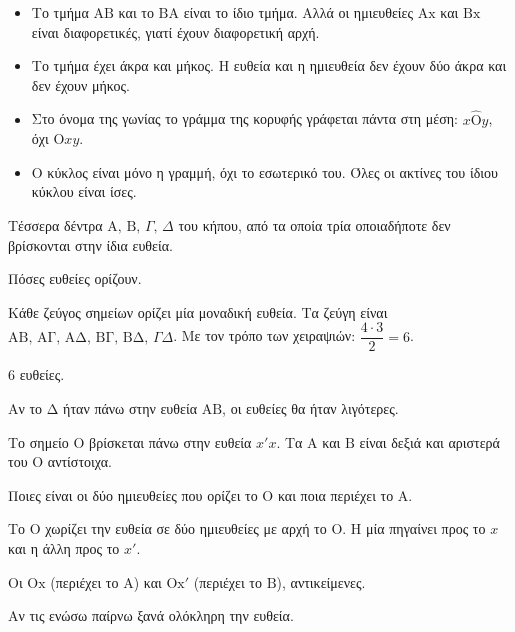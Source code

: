 \begin{center}
\end{center}

\begin{prosoxi}
\begin{itemize}[leftmargin=1.2em,itemsep=0.3ex,topsep=2pt]
\item Το τμήμα $\mathrm{ΑΒ}$ και το $\mathrm{ΒΑ}$ είναι το ίδιο τμήμα. Αλλά οι ημιευθείες $\mathrm{Αx}$ και $\mathrm{Βx}$ είναι διαφορετικές, γιατί έχουν διαφορετική αρχή.
\item Το τμήμα έχει άκρα και μήκος. Η ευθεία και η ημιευθεία δεν έχουν δύο άκρα και δεν έχουν μήκος.
\item Στο όνομα της γωνίας το γράμμα της κορυφής γράφεται πάντα στη μέση: $x\hat{\mathrm{Ο}}y$, όχι $\mathrm{Ο}xy$.
\item Ο κύκλος είναι μόνο η γραμμή, όχι το εσωτερικό του. Όλες οι ακτίνες του ίδιου κύκλου είναι ίσες.
\end{itemize}
\end{prosoxi}


\tixero Τέσσερα δέντρα $\mathrm{Α},\,\mathrm{Β},\,\Gamma,\,\Delta$ του κήπου, από τα οποία τρία οποιαδήποτε δεν βρίσκονται στην ίδια ευθεία.\par
\tithelo Πόσες ευθείες ορίζουν.\par
\possindeo Κάθε ζεύγος σημείων ορίζει μία μοναδική ευθεία. Τα ζεύγη είναι $\mathrm{ΑΒ},\,\mathrm{ΑΓ},\,\mathrm{ΑΔ},\,\mathrm{ΒΓ},\,\mathrm{ΒΔ},\,\Gamma\Delta$. Με τον τρόπο των χειραψιών: $\dfrac{4\cdot3}{2}=6$.\par
\apantisi $6$ ευθείες.\par
\elegxos Αν το $\mathrm{Δ}$ ήταν πάνω στην ευθεία $\mathrm{ΑΒ}$, οι ευθείες θα ήταν λιγότερες.

\tixero Το σημείο $\mathrm{Ο}$ βρίσκεται πάνω στην ευθεία $x'x$. Τα $\mathrm{Α}$ και $\mathrm{Β}$ είναι δεξιά και αριστερά του $\mathrm{Ο}$ αντίστοιχα.\par
\tithelo Ποιες είναι οι δύο ημιευθείες που ορίζει το $\mathrm{Ο}$ και ποια περιέχει το $\mathrm{Α}$.\par
\possindeo Το $\mathrm{Ο}$ χωρίζει την ευθεία σε δύο ημιευθείες με αρχή το $\mathrm{Ο}$. Η μία πηγαίνει προς το $x$ και η άλλη προς το $x'$.\par
\apantisi Οι $\mathrm{Οx}$ (περιέχει το $\mathrm{Α}$) και $\mathrm{Οx'}$ (περιέχει το $\mathrm{Β}$), αντικείμενες.\par
\elegxos Αν τις ενώσω παίρνω ξανά ολόκληρη την ευθεία.

